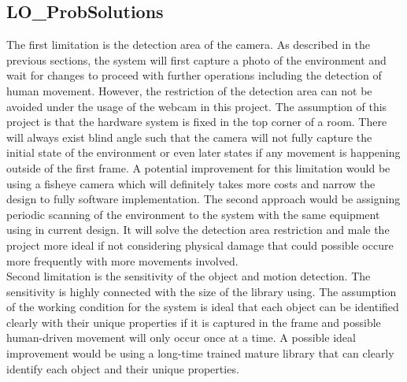 \documentclass[12pt, titlepage]{article}
\begin{document}
\subsection{LO\_ProbSolutions}
\hspace*{1cm}The first limitation is the detection area of the camera. As described in the previous sections, the system will first capture a photo of the environment and wait for changes to proceed with further operations including the detection of human movement. However, the restriction of the detection area can not be avoided under the usage of the webcam in this project. The assumption of this project is that the hardware system is fixed in the top corner of a room. There will always exist blind angle such that the camera will not fully capture the initial state of the environment or even later states if any movement is happening outside of the first frame. A potential improvement for this limitation would be using a fisheye camera which will definitely takes more costs and narrow the design to fully software implementation. The second approach would be assigning periodic scanning of the environment to the system with the same equipment using in current design. It will solve the detection area restriction and male the project more ideal if not considering physical damage that could possible occure more frequently with more movements involved.
\\\hspace*{1cm}Second limitation is the sensitivity of the object and motion detection. The sensitivity is highly connected with the size of the library using. The assumption of the working condition for the system is ideal that each object can be identified clearly with their unique properties if it is captured in the frame and possible human-driven movement will only occur once at a time. A possible ideal improvement would be using a long-time trained mature library that can clearly identify each object and their unique properties. 
\end{document}
